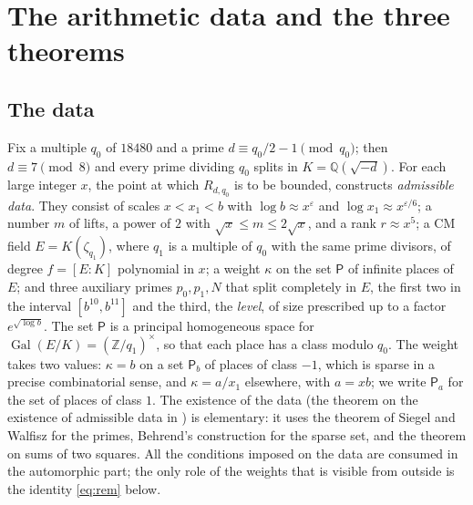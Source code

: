 \documentclass[10pt]{amsart}
\theoremstyle{definition}
\theoremstyle{remark}
\newcommand{\Z}{\mathbb Z}
\newcommand{\Q}{\mathbb Q}
\newcommand{\Pa}{\mathsf P_a}
\newcommand{\Pb}{\mathsf P_b}
\newcommand{\Pl}{\mathsf P}
\begin{document}
\section{The arithmetic data and the three theorems}\label{sec:three}
\subsection{The data}
Fix a multiple $q_0$ of $18480$ and a prime $d\equiv q_0/2-1\pmod{q_0}$; then $d\equiv7\pmod 8$
and every prime dividing $q_0$ splits in $K=\Q(\sqrt{-d})$. For each large integer $x$, the
point at which $R_{d,q_0}$ is to be bounded, \cite{P46} constructs \emph{admissible data}. They
consist of scales $x<x_1<b$ with $\log b\approx x^{\varepsilon}$ and
$\log x_1\approx x^{\varepsilon/6}$; a number $m$ of lifts, a power of $2$ with
$\sqrt x\le m\le2\sqrt x$, and a rank $r\approx x^5$; a CM field $E=K(\zeta_{q_1})$, where
$q_1$ is a multiple of $q_0$ with the same prime divisors, of degree $f=[E:K]$ polynomial in
$x$; a weight $\kappa$ on the set $\Pl$ of infinite places of $E$; and three auxiliary primes
$p_0,p_1,N$ that split completely in $E$, the first two in the interval $[b^{10},b^{11}]$ and the third,
the \emph{level}, of size prescribed up to a factor $e^{\sqrt{\log b}}$. The set $\Pl$ is a
principal homogeneous space for $\operatorname{Gal}(E/K)=(\Z/q_1)^\times$, so that each place
has a class modulo $q_0$. The weight takes two values: $\kappa=b$ on a set $\Pb$ of places of
class $-1$, which is sparse in a precise combinatorial sense, and $\kappa=a/x_1$ elsewhere,
with $a=xb$; we write $\Pa$ for the set of places of class $1$. The existence of the data
(the theorem on the existence of admissible data in \cite{P46}) is elementary: it uses the theorem of Siegel and Walfisz
\cite{Davenport} for the primes, Behrend's construction for the sparse set, and the theorem on
sums of two squares. All the conditions imposed on the data are consumed in the automorphic
part; the only role of the weights that is visible from outside is the identity
\eqref{eq:rem} below.
\end{document}

